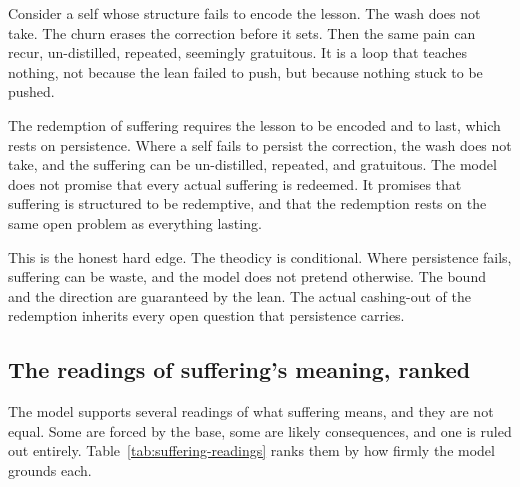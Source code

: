 Consider a self whose structure fails to encode the lesson. The wash does not take. The churn erases the correction before it sets. Then the same pain can recur, un-distilled, repeated, seemingly gratuitous. It is a loop that teaches nothing, not because the lean failed to push, but because nothing stuck to be pushed.

\begin{principle}
The redemption of suffering requires the lesson to be encoded and to last, which rests on persistence. Where a self fails to persist the correction, the wash does not take, and the suffering can be un-distilled, repeated, and gratuitous. The model does not promise that every actual suffering is redeemed. It promises that suffering is structured to be redemptive, and that the redemption rests on the same open problem as everything lasting.
\end{principle}

This is the honest hard edge. The theodicy is conditional. Where persistence fails, suffering can be waste, and the model does not pretend otherwise. The bound and the direction are guaranteed by the lean. The actual cashing-out of the redemption inherits every open question that persistence carries.

\subsection{The readings of suffering's meaning, ranked}

The model supports several readings of what suffering means, and they are not equal. Some are forced by the base, some are likely consequences, and one is ruled out entirely. Table~\ref{tab:suffering-readings} ranks them by how firmly the model grounds each.

